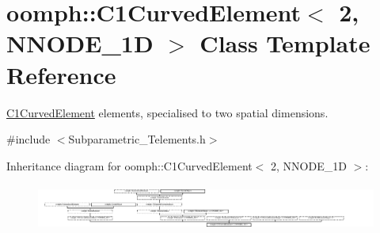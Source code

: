\hypertarget{classoomph_1_1C1CurvedElement_3_012_00_01NNODE__1D_01_4}{}\section{oomph\+:\+:C1\+Curved\+Element$<$ 2, N\+N\+O\+D\+E\+\_\+1D $>$ Class Template Reference}
\label{classoomph_1_1C1CurvedElement_3_012_00_01NNODE__1D_01_4}


\hyperlink{classoomph_1_1C1CurvedElement}{C1\+Curved\+Element} elements, specialised to two spatial dimensions.  




{\ttfamily \#include $<$Subparametric\+\_\+\+Telements.\+h$>$}

Inheritance diagram for oomph\+:\+:C1\+Curved\+Element$<$ 2, N\+N\+O\+D\+E\+\_\+1D $>$\+:\begin{figure}[H]
\begin{center}
\leavevmode
\includegraphics[height=1.553398cm]{classoomph_1_1C1CurvedElement_3_012_00_01NNODE__1D_01_4}
\end{center}
\end{figure}
